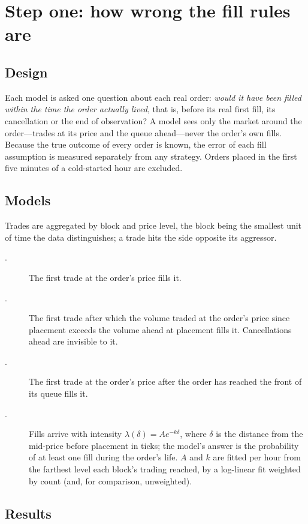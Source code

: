 \section{Step one: how wrong the fill rules are}
\label{sec:fillmodels}

\subsection{Design}
Each model is asked one question about each real order: \emph{would it have been
filled within the time the order actually lived}, that is, before its real
first fill, its cancellation or the end of observation? A model sees only the
market around the order---trades at its price and the queue ahead---never the
order's own fills. Because the true outcome of every order is known, the error
of each fill assumption is measured separately from any strategy. Orders placed
in the first five minutes of a cold-started hour are excluded.

\subsection{Models}
Trades are aggregated by block and price level, the block being the smallest
unit of time the data distinguishes; a trade hits the side opposite its
aggressor.
\begin{description}
  \item[\touch.] The first trade at the order's price fills it.
  \item[\vt.] The first trade after which the volume traded at the order's price
  since placement exceeds the volume ahead at placement fills it. Cancellations
  ahead are invisible to it.
  \item[\qa.] The first trade at the order's price after the order has reached
  the front of its queue fills it.
  \item[\clock.] Fills arrive with intensity $\lambda(\delta)=A e^{-k\delta}$,
  where $\delta$ is the distance from the mid-price before placement in ticks;
  the model's answer is the probability of at least one fill during the order's
  life. $A$ and $k$ are fitted per hour from the farthest level each block's
  trading reached, by a log-linear fit weighted by count (and, for comparison,
  unweighted).
\end{description}

\subsection{Results}

